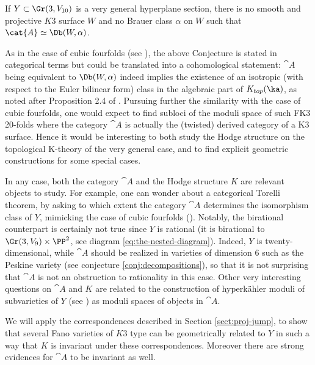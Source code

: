 \begin{conjecture}\label{conj:hodgeandD}
If $Y \subset \Gr(3,V_{10})$ is a very general hyperplane section,
there is no smooth and projective $K3$ surface $W$ and no Brauer class $\alpha$ on $W$ such
that $\cat{A} \simeq \Db(W,\alpha)$.
\end{conjecture}

\begin{remark}
As in the case of cubic fourfolds (see \cite{kuz:4fold,at12}), the above Conjecture is stated in
categorical terms but could be translated into a cohomological statement: $\cat{A}$ being equivalent to $\Db(W, \alpha)$
indeed implies the existence of an isotropic (with respect to the Euler bilinear form) class in the algebraic part of $K_{top}(\ka)$,
as noted after Proposition 2.4 of \cite{at12}.
Pursuing further the similarity with the case of cubic fourfolds, one would expect to find subloci of the moduli space of such FK3 20-folds
where the category $\cat{A}$ is actually the (twisted) derived category of a K3 surface. Hence it would be interesting to both
study the Hodge structure on the topological K-theory of the very general case, and to find explicit geometric constructions
for some special cases.
\end{remark}

\vspace*{-5pt}\enlargethispage{.5\baselineskip}%
In any case, both the category $\cat{A}$ and the Hodge structure $K$ are relevant objects to study.
For example, one can wonder about a categorical Torelli theorem, by asking to which extent
the category $\cat{A}$ determines the isomorphism class of $Y$, mimicking the case of
cubic fourfolds (\cite{huybrechts-rennemo,BLMS,Li-Per-Xiao}). Notably, the birational
counterpart is certainly not true since $Y$ is rational (it is birational to $\Gr(3,V_9) \times \PP^2$,
see diagram \eqref{eq:the-nested-diagram}). Indeed, $Y$
is twenty-dimensional, while $\cat{A}$ should be realized in varieties
of dimension $6$ such as the Peskine variety (see conjecture \ref{conj:decompositions}), so that
it is not surprising that $\cat{A}$ is not an obstruction to rationality in this case.
Other very interesting questions on $\cat{A}$ and $K$ are related to the construction of hyperkähler moduli
of subvarieties of $Y$ (see \cite{debarre-voisin}) as moduli spaces of objects in $\cat{A}$.

We will apply the correspondences described in Section \ref{sect:proj-jump}, to show that several Fano varieties of $K3$ type can be geometrically related to $Y$ in such a way that $K$ is invariant under these correspondences. Moreover there are strong evidences for $\cat{A}$ to be invariant as well.


